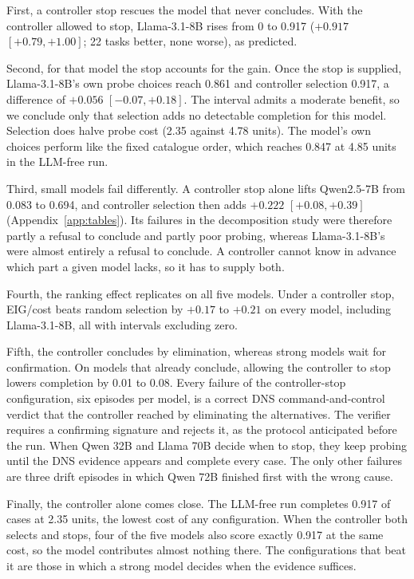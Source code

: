First, a controller stop rescues the model that never concludes. With the controller allowed to stop, Llama-3.1-8B rises from 0 to 0.917 ($+0.917$ $[+0.79,+1.00]$; 22 tasks better, none worse), as predicted.

Second, for that model the stop accounts for the gain. Once the stop is supplied, Llama-3.1-8B's own probe choices reach 0.861 and controller selection 0.917, a difference of $+0.056$ $[-0.07,+0.18]$. The interval admits a moderate benefit, so we conclude only that selection adds no detectable completion for this model. Selection does halve probe cost (2.35 against 4.78 units). The model's own choices perform like the fixed catalogue order, which reaches 0.847 at 4.85 units in the LLM-free run.

Third, small models fail differently. A controller stop alone lifts Qwen2.5-7B from 0.083 to 0.694, and controller selection then adds $+0.222$ $[+0.08,+0.39]$ (Appendix~\ref{app:tables}). Its failures in the decomposition study were therefore partly a refusal to conclude and partly poor probing, whereas Llama-3.1-8B's were almost entirely a refusal to conclude. A controller cannot know in advance which part a given model lacks, so it has to supply both.

Fourth, the ranking effect replicates on all five models. Under a controller stop, EIG/cost beats random selection by $+0.17$ to $+0.21$ on every model, including Llama-3.1-8B, all with intervals excluding zero.

Fifth, the controller concludes by elimination, whereas strong models wait for confirmation. On models that already conclude, allowing the controller to stop lowers completion by 0.01 to 0.08. Every failure of the controller-stop configuration, six episodes per model, is a correct DNS command-and-control verdict that the controller reached by eliminating the alternatives. The verifier requires a confirming signature and rejects it, as the protocol anticipated before the run. When Qwen 32B and Llama 70B decide when to stop, they keep probing until the DNS evidence appears and complete every case. The only other failures are three drift episodes in which Qwen 72B finished first with the wrong cause.

Finally, the controller alone comes close. The LLM-free run completes 0.917 of cases at 2.35 units, the lowest cost of any configuration. When the controller both selects and stops, four of the five models also score exactly 0.917 at the same cost, so the model contributes almost nothing there. The configurations that beat it are those in which a strong model decides when the evidence suffices.

